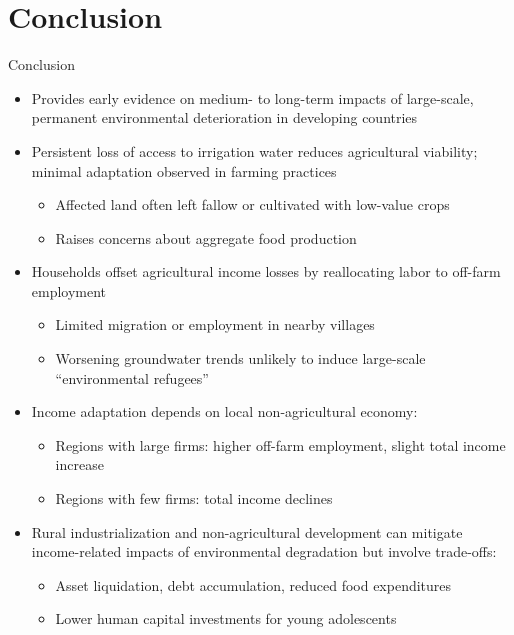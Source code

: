 \documentclass[10pt]{beamer}
\begin{document}
\section{Conclusion}

\begin{frame}
	{Conclusion}
	\begin{itemize}
		\item Provides early evidence on medium- to long-term impacts of large-scale, permanent environmental deterioration in developing countries
		\item Persistent loss of access to irrigation water reduces agricultural viability; minimal adaptation observed in farming practices
		      \begin{itemize}
			      \item Affected land often left fallow or cultivated with low-value crops
			      \item Raises concerns about aggregate food production
		      \end{itemize}
		\item Households offset agricultural income losses by reallocating labor to off-farm employment
		      \begin{itemize}
			      \item Limited migration or employment in nearby villages
			      \item Worsening groundwater trends unlikely to induce large-scale “environmental refugees”
		      \end{itemize}
		\item Income adaptation depends on local non-agricultural economy:
		      \begin{itemize}
			      \item Regions with large firms: higher off-farm employment, slight total income increase
			      \item Regions with few firms: total income declines
		      \end{itemize}
		\item Rural industrialization and non-agricultural development can mitigate income-related impacts of environmental degradation but involve trade-offs:
		      \begin{itemize}
			      \item Asset liquidation, debt accumulation, reduced food expenditures
			      \item Lower human capital investments for young adolescents
		      \end{itemize}
	\end{itemize}
\end{frame}
\end{document}
